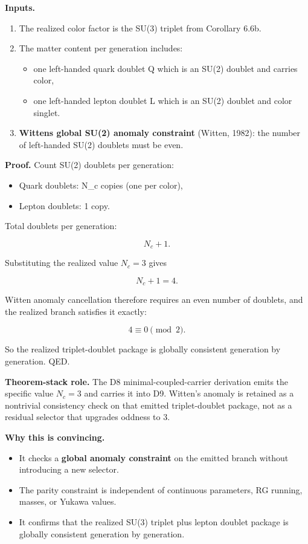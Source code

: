 \textbf{Inputs.}

\begin{enumerate}
\def\labelenumi{\arabic{enumi}.}
\tightlist
\item
  The realized color factor is the SU(3) triplet from Corollary 6.6b.
\item
  The matter content per generation includes:

  \begin{itemize}
  \tightlist
  \item
    one left-handed quark doublet Q which is an SU(2) doublet and carries color,
  \item
    one left-handed lepton doublet L which is an SU(2) doublet and color singlet.
  \end{itemize}
\item
  \textbf{Witten\textquotesingle s global SU(2) anomaly constraint} (Witten, 1982): the number of left-handed SU(2) doublets must be even.
\end{enumerate}

\textbf{Proof.} Count SU(2) doublets per generation:

\begin{itemize}
\tightlist
\item
  Quark doublets: N\_c copies (one per color),
\item
  Lepton doublets: 1 copy.
\end{itemize}

Total doublets per generation:

\[
N_c + 1.
\]

Substituting the realized value \(N_c=3\) gives

\[
N_c+1=4.
\]

Witten anomaly cancellation therefore requires an even number of doublets, and the realized branch satisfies it exactly:

\[
4 \equiv 0 \pmod{2}.
\]

So the realized triplet-doublet package is globally consistent generation by generation. QED.

\textbf{Theorem-stack role.} The D8 minimal-coupled-carrier derivation emits the specific value \(N_c=3\) and carries it into D9. Witten's anomaly is retained as a nontrivial consistency check on that emitted triplet-doublet package, not as a residual selector that upgrades oddness to \(3\).

\textbf{Why this is convincing.}

\begin{itemize}
\tightlist
\item
  It checks a \textbf{global anomaly constraint} on the emitted branch without introducing a new selector.
\item
  The parity constraint is independent of continuous parameters, RG running, masses, or Yukawa values.
\item
  It confirms that the realized SU(3) triplet plus lepton doublet package is globally consistent generation by generation.
\end{itemize}

